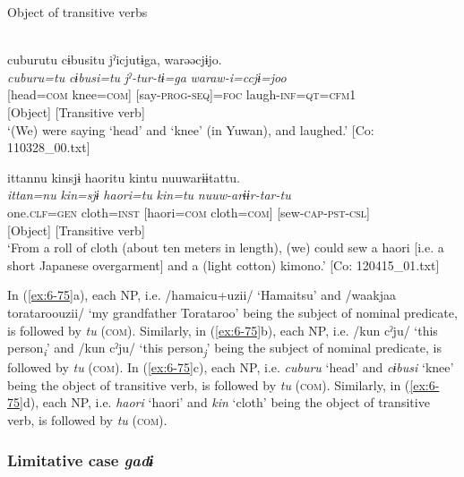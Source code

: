   Object of transitive verbs

\ex{}\\
{\TM}
\gllll  cuburutu  cɨbusitu  jˀicjutɨga,  warəəcjɨjo.\\
\textit{cuburu=tu}  \textit{cɨbusi=tu}  \textit{jˀ-tur-tɨ=ga}  \textit{waraw-i=ccjɨ=joo}\\
{}[head=\textsc{com}  knee=\textsc{com}]  [say-\textsc{prog}-\textsc{seq}]=\textsc{foc}  laugh-\textsc{inf}=\textsc{qt}=\textsc{cfm}1\\
      {}[Object]  [Transitive verb]  \\
\glt ‘(We) were saying ‘head’ and ‘knee’ (in Yuwan), and laughed.’ [Co: 110328\_00.txt]

\ex
{\TM}
\gllll  ittannu  kinsjɨ  {\textbar}haori{\textbar}tu  kintu  nuuwarɨɨtattu.\\
\textit{ittan=nu}  \textit{kin=sjɨ}  \textit{haori=tu}  \textit{kin=tu}  \textit{nuuw-arɨɨr-tar-tu}\\
one.\textsc{clf}=\textsc{gen}  cloth=\textsc{inst}  [haori=\textsc{com}  cloth=\textsc{com}]  [sew-\textsc{cap}-\textsc{pst}-\textsc{csl}]\\
          {}[Object]  [Transitive verb]\\
\glt ‘From a roll of cloth (about ten meters in length), (we) could sew a haori [i.e. a short Japanese overgarment] and a (light cotton) kimono.’ [Co: 120415\_01.txt]
\z
\z

In (\ref{ex:6-75}a), each NP, i.e. /hamaicu+uzii/ ‘Hamaitsu’ and /waakjaa torataroouzii/ ‘my grandfather Torataroo’ being the subject of nominal predicate, is followed by \textit{tu} (\textsc{com}). Similarly, in (\ref{ex:6-75}b), each NP, i.e. /kun cˀju/ ‘this person\textit{\textsubscript{i}}’ and /kun cˀju/ ‘this person\textit{\textsubscript{j}}’ being the subject of nominal predicate, is followed by \textit{tu} (\textsc{com}). In (\ref{ex:6-75}c), each NP, i.e. \textit{cuburu} ‘head’ and \textit{cɨbusi} ‘knee’ being the object of transitive verb, is followed by \textit{tu} (\textsc{com}). Similarly, in (\ref{ex:6-75}d), each NP, i.e. \textit{haori} ‘haori’ and \textit{kin} ‘cloth’ being the object of transitive verb, is followed by \textit{tu} (\textsc{com}).

\subsubsection{ Limitative case \textit{gadɨ}}

